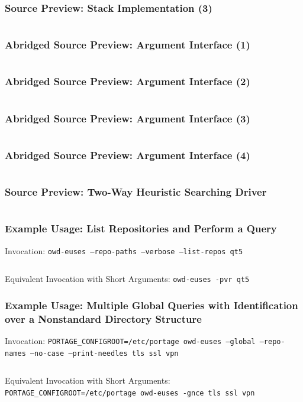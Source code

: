 \documentclass{beamer}
\numberwithin{figure}{section}
\newcounter{firstsrcline}
\newcounter{lastsrcline}
\newcommand\srclinelimit{29}
\newcommand\resetsrclines{%
    \setcounter{firstsrcline}{1}
    \setcounter{lastsrcline}{\thefirstsrcline+\srclinelimit}
}
\newcommand\continuesource[1]{%
    \inputminted[firstline=\thefirstsrcline, lastline=\thelastsrcline,
        firstnumber=\thefirstsrcline]{c}{listings/#1}
    \setcounter{firstsrcline}{\thelastsrcline+1}
    \setcounter{lastsrcline}{\thefirstsrcline+\srclinelimit}
}
\begin{document}
\begin{frame}
    \frametitle{Source Preview: Stack Implementation (3)}
    \continuesource{stack.c}
\end{frame}
\begin{frame}
    \frametitle{Abridged Source Preview: Argument Interface (1)}
    \resetsrclines
    \continuesource{args.h}
\end{frame}
\begin{frame}
    \frametitle{Abridged Source Preview: Argument Interface (2)}
    \continuesource{args.h}
\end{frame}
\begin{frame}
    \frametitle{Abridged Source Preview: Argument Interface (3)}
    \continuesource{args.h}
\end{frame}
\begin{frame}
    \frametitle{Abridged Source Preview: Argument Interface (4)}
    \continuesource{args.h}
\end{frame}
\begin{frame}
    \frametitle{Source Preview: Two-Way Heuristic Searching Driver}
    \nointerlineskip
    \resetsrclines
    \continuesource{twoway.c}
\end{frame}
\begin{frame}
    \frametitle{Example Usage: List Repositories and Perform a Query}
    Invocation: \texttt{owd-euses --repo-paths --verbose --list-repos qt5}
    \par\vfill
    \inputminted{text}{listings/qt.example}
    \vfill\par
    Equivalent Invocation with Short Arguments: \texttt{owd-euses -pvr qt5}
\end{frame}
\begin{frame}
    \frametitle{Example Usage: Multiple Global Queries with Identification over
        a Nonstandard Directory Structure}
    Invocation: \texttt{PORTAGE\_CONFIGROOT=/etc/portage owd-euses --global
        \hspace*{1em} --repo-names --no-case --print-needles tls ssl vpn}
    \par\vfill
    \inputminted{text}{listings/tls.example}
    \vfill\par
    Equivalent Invocation with Short Arguments:
    \texttt{PORTAGE\_CONFIGROOT=/etc/portage owd-euses -gnce tls ssl vpn}
\end{frame}
\end{document}
